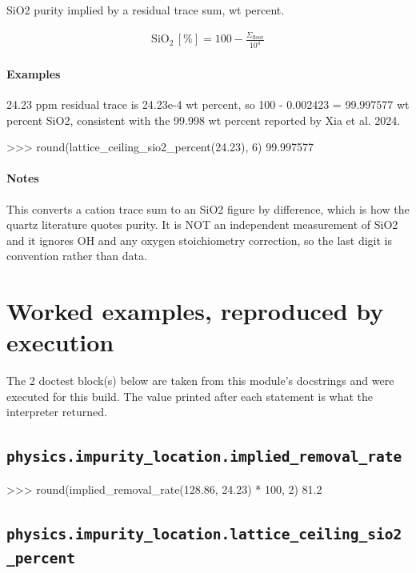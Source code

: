 \documentclass[10pt,a4paper,twoside]{report}
\begin{document}
SiO2 purity implied by a residual trace sum, wt percent.

\begin{equation*}
\begin{gathered}
\mathrm{SiO_2}\,[\%] = 100 - \frac{\Sigma_{\text{floor}}}{10^{4}}
\end{gathered}
\end{equation*}

\paragraph*{Examples}

24.23 ppm residual trace is 24.23e-4 wt percent, so 100 - 0.002423 = 99.997577 wt percent SiO2, consistent with the 99.998 wt percent reported by Xia et al. 2024.

\begin{doctestblock}
>>> round(lattice_ceiling_sio2_percent(24.23), 6)
99.997577
\end{doctestblock}

\paragraph*{Notes}

This converts a cation trace sum to an SiO2 figure by difference, which is how the quartz literature quotes purity. It is NOT an independent measurement of SiO2 and it ignores OH and any oxygen stoichiometry correction, so the last digit is convention rather than data.

\section{Worked examples, reproduced by execution}

The 2 doctest block(s) below are taken from this module's docstrings and were executed for this build. The value printed after each statement is what the interpreter returned.

\subsection*{\texttt{physics.impurity\_location.implied\_removal\_rate}}

\begin{doctestblock}
>>> round(implied_removal_rate(128.86, 24.23) * 100, 2)
81.2
\end{doctestblock}

\subsection*{\texttt{physics.impurity\_location.lattice\_ceiling\_sio2\_percent}}
\end{document}
